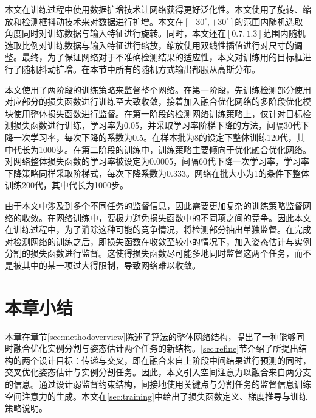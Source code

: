 本文在训练过程中使用数据扩增技术让网络获得更好泛化性。本文使用了旋转、缩放和检测框抖动技术来对数据进行扩增。本文在$[-30^\circ, +30^\circ]$的范围内随机选取角度同时对训练数据与输入特征进行旋转。同时，本文还在$[0.7, 1.3]$范围内随机选取比例对训练数据与输入特征进行缩放，缩放使用双线性插值进行对尺寸的调整。最终，为了保证网络对于不准确检测结果的适应性，本文对训练用的目标框进行了随机抖动扩增。在本节中所有的随机方式输出都服从高斯分布。

本文使用了两阶段的训练策略来监督整个网络。在第一阶段，先训练检测部分使用对应部分的损失函数进行训练至大致收敛，接着加入融合优化网络的多阶段优化模块使用整体损失函数进行监督。在第一阶段的检测网络训练策略上，仅针对目标检测损失函数进行训练，学习率为0.05，并采取学习率阶梯下降的方法，间隔30代下降一次学习率，每次下降的系数为0.5。在样本批为8的设定下整体训练120代，其中代长为1000步。在第二阶段的训练中，训练策略主要倾向于优化融合优化网络。对网络整体损失函数的学习率被设定为0.0005，间隔60代下降一次学习率，学习率下降策略同样采取阶梯式，每次下降系数为0.333。网络在批大小为1的条件下整体训练200代，其中代长为1000步。

由于本文中涉及到多个不同任务的监督信息，因此需要更加复杂的训练策略监督网络的收敛。在网络训练中，要极力避免损失函数中的不同项之间的竞争。因此本文在训练过程中，为了消除这种可能的竞争情况，将检测部分抽出单独监督。在完成对检测网络的训练之后，即损失函数在收敛至较小的情况下，加入姿态估计与实例分割的损失函数进行监督。这使得损失函数尽可能多地同时监督这两个任务，而不是被其中的某一项过大得限制，导致网络难以收敛。

\section{本章小结}
本章在章节\ref{sec:methodoverview}陈述了算法的整体网络结构，提出了一种能够同时融合优化实例分割与姿态估计两个任务的新结构。\ref{sec:refine}节介绍了所提出结构的两个设计目标：传递与交叉，即在融合来自上阶段中间结果进行预测的同时，交叉优化姿态估计与实例分割任务。因此，本文引入空间注意力以融合来自两分支的信息。通过设计弱监督约束结构，间接地使用关键点与分割任务的监督信息训练空间注意力的生成。本文在\ref{sec:training}中给出了损失函数定义、梯度推导与训练策略说明。